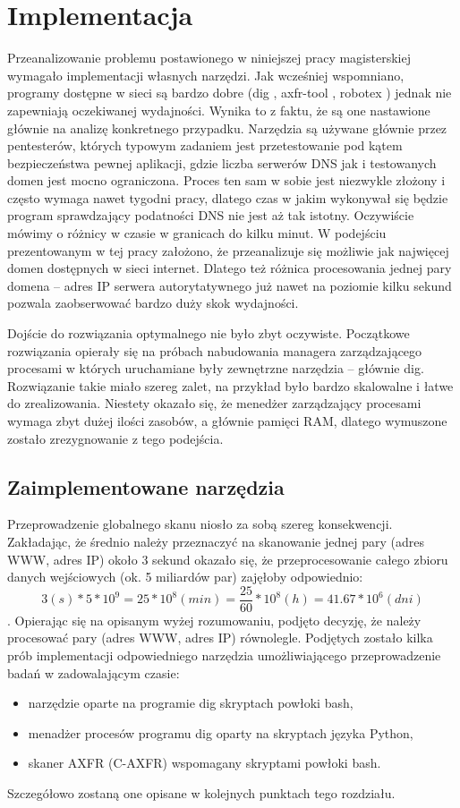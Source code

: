 \chapter{Implementacja}
Przeanalizowanie problemu postawionego w niniejszej pracy magisterskiej wymagało implementacji własnych narzędzi. Jak wcześniej wspomniano, programy dostępne w sieci są bardzo dobre (dig \cite{dig}, axfr-tool \cite{git_axfr_tool}, robotex \cite{robotex}) jednak nie zapewniają oczekiwanej wydajności. Wynika to z faktu, że są one nastawione głównie na analizę konkretnego przypadku. Narzędzia są używane głównie przez pentesterów, których typowym zadaniem jest przetestowanie pod kątem bezpieczeństwa pewnej aplikacji, gdzie liczba serwerów DNS jak i testowanych domen jest mocno ograniczona. Proces ten sam w sobie jest niezwykle złożony i często wymaga nawet tygodni pracy, dlatego czas w jakim wykonywał się będzie program sprawdzający podatności DNS nie jest aż tak istotny. Oczywiście mówimy o różnicy w czasie w granicach do kilku minut. W podejściu prezentowanym w tej pracy założono, że przeanalizuje się możliwie jak najwięcej domen dostępnych w sieci internet. Dlatego też różnica procesowania jednej pary domena -- adres IP serwera autorytatywnego już nawet na poziomie kilku sekund pozwala zaobserwować bardzo duży skok wydajności. 

Dojście do rozwiązania optymalnego nie było zbyt oczywiste. Początkowe rozwiązania opierały się na próbach nabudowania managera zarządzającego procesami w których uruchamiane były zewnętrzne narzędzia -- głównie dig. Rozwiązanie takie miało szereg zalet, na przykład było bardzo skalowalne i łatwe do zrealizowania. Niestety okazało się, że menedżer zarządzający procesami wymaga zbyt dużej ilości zasobów, a głównie pamięci RAM, dlatego wymuszone zostało zrezygnowanie z tego podejścia. 

\section{Zaimplementowane narzędzia}
Przeprowadzenie globalnego skanu niosło za sobą szereg konsekwencji. Zakładając, że średnio należy przeznaczyć na skanowanie jednej pary (adres WWW, adres IP) około 3 sekund okazało się, że przeprocesowanie całego zbioru danych wejściowych (ok. 5 miliardów par) zajęłoby odpowiednio:
$$3(s) * 5 * 10^{9} = 25 * 10^{8}(min) = \frac{25}{60} * 10^{8}(h) = 41.67 * 10^{6} (dni)\label{obliczenia}$$.
Opierając się na opisanym wyżej rozumowaniu, podjęto decyzję, że należy procesować pary (adres WWW, adres IP) równolegle. Podjętych zostało kilka prób implementacji odpowiedniego narzędzia umożliwiającego przeprowadzenie badań w zadowalającym czasie:
\begin{itemize}
	\item narzędzie oparte na programie dig skryptach powłoki bash,
	\item menadżer procesów programu dig oparty na skryptach języka Python,
	\item skaner AXFR (C-AXFR) wspomagany skryptami powłoki bash.
\end{itemize}
Szczegółowo zostaną one opisane w kolejnych punktach tego rozdziału.

